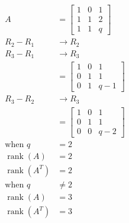 \documentclass[main.tex]{subfiles}
\begin{document}
\begin{enumerate}
    $$
    \begin{aligned}
    A&=\left[\begin{array}{lll}
    1 & 0 & 1 \\
    1 & 1 & 2 \\
    1 & 1 & q
    \end{array}\right]\\
    R_2 - R_1 & \rightarrow R_2\\
    R_3 - R_1 & \rightarrow R_3\\
    &=\left[\begin{array}{ccc}
    1 & 0 & 1 \\
    0 & 1 & 1 \\
    0 & 1 & q-1
    \end{array}\right]\\
    R_3 - R_2 & \rightarrow R_3\\
    &=\left[\begin{array}{ccc}
    1 & 0 & 1 \\
    0 & 1 & 1 \\
    0 & 0 & q-2
    \end{array}\right]\\
    \text{when } q &= 2\\
    \operatorname{rank}(A)&=2\\
    \operatorname{rank}\left(A^{T}\right)&=2\\
    \text{when } q & \neq 2\\
    \operatorname{rank}(A)&=3\\
    \operatorname{rank}\left(A^{T}\right)&=3\\
    \end{aligned}
    $$
    
\end{enumerate}
\end{document}
